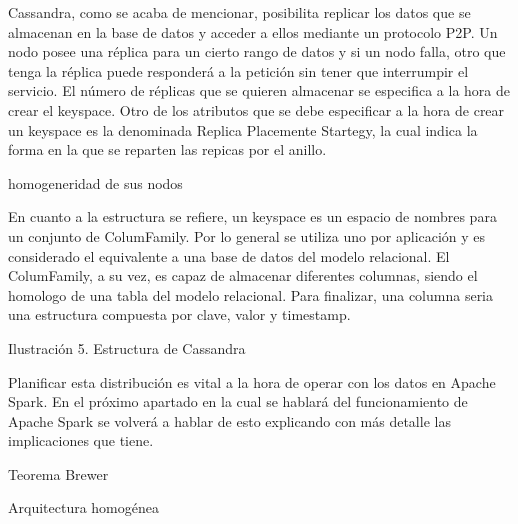 Cassandra, como se acaba de mencionar, posibilita replicar los datos que se almacenan en la base de datos y acceder a ellos mediante un protocolo P2P. Un nodo posee una réplica para un cierto rango de datos y si un nodo falla, otro que tenga la réplica puede responderá a la petición sin tener que interrumpir el servicio. El número de réplicas que se quieren almacenar se especifica a la hora de crear el keyspace. Otro de los atributos que se debe especificar a la hora de crear un keyspace es la denominada Replica Placemente Startegy, la cual indica la forma en la que se reparten las repicas por el anillo.

homogeneridad de sus nodos

En cuanto a la estructura se refiere, un keyspace es un espacio de nombres para un conjunto de ColumFamily. Por lo general se utiliza uno por aplicación y es considerado el equivalente a una base de datos del modelo relacional. El ColumFamily, a su vez, es capaz de almacenar diferentes columnas, siendo el homologo de una tabla del modelo relacional. Para finalizar, una columna seria una estructura compuesta por clave, valor y timestamp.


Ilustración 5. Estructura de Cassandra



Planificar esta distribución es vital a la hora de operar con los datos en Apache Spark. En el próximo apartado en la cual se hablará del funcionamiento de Apache Spark se volverá a hablar de esto explicando con más detalle las implicaciones que tiene.

Teorema Brewer

Arquitectura homogénea


